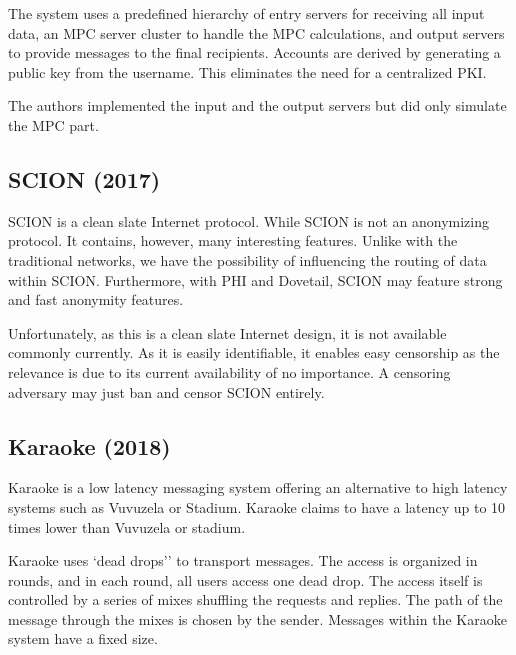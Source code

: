 The system uses a predefined hierarchy of entry servers for receiving all input data, an MPC server cluster to handle the MPC calculations, and output servers to provide messages to the final recipients. Accounts are derived by generating a public key from the username. This eliminates the need for a centralized PKI. 

The authors implemented the input and the output servers but did only simulate the MPC part.

%

%
%

\subsection{SCION (2017)}
SCION\cite{perrig2017scion} is a clean slate Internet protocol. While SCION is not an anonymizing protocol. It contains, however,  many interesting features. Unlike with the traditional networks, we have the possibility of influencing the routing of data within SCION. Furthermore, with PHI\cite{chen2017phi} and Dovetail\cite{sankey2014dovetail}, SCION may feature strong and fast anonymity features. 

Unfortunately, as this is a clean slate Internet design, it is not available commonly currently. As it is easily identifiable, it enables easy censorship as the relevance is due to its current availability of no importance. A censoring adversary may just ban and censor SCION entirely. 

\subsection{Karaoke (2018)}
Karaoke\cite{lazar2018karaoke} is a low latency messaging system offering an alternative to high latency systems such as Vuvuzela or Stadium. Karaoke claims to have a latency up to 10 times lower than Vuvuzela or stadium. 

Karaoke uses `dead drops'' to transport messages. The access is organized in rounds, and in each round, all users access one dead drop. The access itself is controlled by a series of mixes shuffling the requests and replies. The path of the message through the mixes is chosen by the sender. Messages within the Karaoke system have a fixed size.

